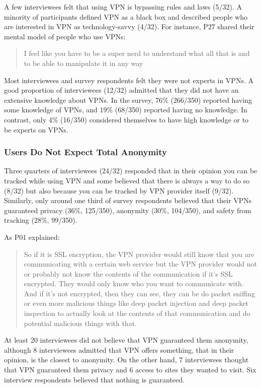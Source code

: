 A few interviewees felt that using VPN is
bypassing rules and laws (5/32). A minority of participants defined VPN as a black box and described people who are
interested in VPN as technology-savvy (4/32). For instance, P27 shared their mental model of
people who use VPNs: \begin{quote}I feel like you have to be a super nerd to  understand what all that is and to be able to manipulate it in any
way\end{quote}

Most interviewees and survey respondents felt they were not experts in VPNs. A good proportion of interviewees (12/32) admitted that they did not have an extensive knowledge
about VPNs. In the survey, 76\% (266/350) reported having some knowledge of
VPNs, and 19\% (68/350) reported having no knowledge. In contrast, only 4\%
(16/350) considered themselves to have high knowledge or to be experts on
VPNs.




\subsubsection{Users Do Not Expect Total Anonymity} 
Three quarters of interviewees (24/32) responded that in their opinion you can be tracked
while using VPN and some believed that there is always a way to do so
(8/32) but also because you can be tracked by VPN provider itself (9/32). Similarly, only around one third of survey respondents believed that their VPNs guaranteed privacy (36\%,
125/350), anonymity (30\%, 104/350), and safety from tracking (28\%, 99/350).

As P01 explained:

\begin{quote}So if it is SSL encryption, the VPN provider would still know
that you are communicating with a certain web service but the VPN provider
would not or probably not know the contents of the communication if it's SSL
encrypted. They would only know who you want to communicate with. And if it's
not encrypted, then they can see, they can be do packet sniffing or even more
malicious things like deep packet injection and deep packet inspection to
actually look at the contents of that communication and do potential malicious
things with that. \end{quote}

At least 20 interviewees did not
believe that VPN guaranteed them anonymity, although 8 interviewees admitted
that VPN offers something, that in their opinion, is the closest to anonymity.
On the other hand, 7 interviewees thought that VPN guaranteed them privacy and
6 access to sites they wanted to visit. Six interview respondents believed
that nothing is guaranteed.

